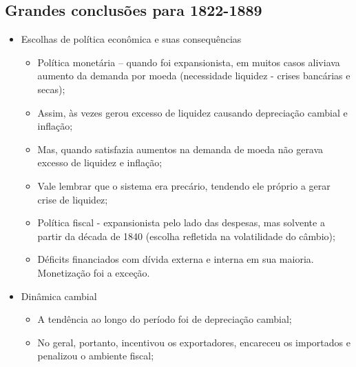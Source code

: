 \documentclass[a4paper,12pt]{article}[abntex2]
\begin{document}
\subsection{\textbf{Grandes conclusões para 1822-1889}}
\begin{itemize}
    \item Escolhas de política econômica e suas consequências
    \begin{itemize}
        \item  Política monetária – quando foi expansionista, em muitos casos aliviava aumento da demanda por moeda (necessidade liquidez - crises bancárias e secas);
    \end{itemize}
    \begin{itemize}
        \item Assim, às vezes gerou excesso de liquidez causando depreciação cambial e inflação;
    \end{itemize}
    \begin{itemize}
        \item Mas, quando satisfazia aumentos na demanda de moeda não gerava excesso de liquidez e inflação;
    \end{itemize}  
    \begin{itemize}
        \item Vale lembrar que o sistema era precário, tendendo ele próprio a gerar crise de liquidez;
    \end{itemize}
    \begin{itemize}
        \item Política fiscal - expansionista pelo lado das despesas, mas solvente a partir da década de 1840 (escolha refletida na volatilidade do câmbio);
    \end{itemize}
    \begin{itemize}
        \item Déficits financiados com dívida externa e interna em sua maioria. Monetização foi a exceção.
    \end{itemize}
\item  Dinâmica cambial
\begin{itemize}
    \item A tendência ao longo do período foi de depreciação cambial;
\end{itemize}
\begin{itemize}
    \item No geral, portanto, incentivou os exportadores, encareceu os importados e penalizou o ambiente fiscal;
\end{itemize}

\end{itemize}
\end{document}
